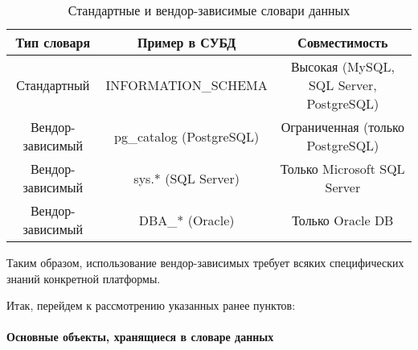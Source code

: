 \begin{table}[H]
    \centering
    \begin{tabular}{|c|c|c|}
        \hline
        \textbf{Тип словаря} & \textbf{Пример в СУБД} & \textbf{Совместимость} \\
        \hline
        Стандартный & INFORMATION\_SCHEMA & Высокая (MySQL, SQL Server, PostgreSQL) \\
        \hline
        Вендор-зависимый & pg\_catalog (PostgreSQL) & Ограниченная (только PostgreSQL) \\
        \hline
        Вендор-зависимый & sys.* (SQL Server) & Только Microsoft SQL Server \\
        \hline
        Вендор-зависимый & DBA\_* (Oracle) & Только Oracle DB \\
        \hline
    \end{tabular}
    \caption{Стандартные и вендор-зависимые словари данных}
    \label{tab:data_dictionary_comparison}
\end{table}

Таким образом, использование вендор-зависимых требует всяких специфических знаний конкретной платформы.

Итак, перейдем к рассмотрению указанных ранее пунктов:

\paragraph{Основные объекты, хранящиеся в словаре данных}


